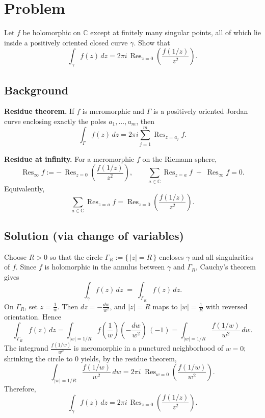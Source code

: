 \documentclass[12pt,a4paper]{article}
\begin{document}
	\section*{Problem}
	Let \(f\) be holomorphic on \(\mathbb C\) except at finitely many singular points, all of which lie inside a positively oriented closed curve \(\gamma\).
	Show that
	\[
	\int_{\gamma} f(z)\,dz
	=2\pi i \,\operatorname{Res}_{z=0}\!\left(\frac{f(1/z)}{z^{2}}\right).
	\]
	
	\subsection*{Background}
	\textbf{Residue theorem.}
	If \(f\) is meromorphic and \(\Gamma\) is a positively oriented Jordan curve enclosing exactly the poles \(a_1,\dots,a_m\),
	then
	\[
	\int_{\Gamma} f(z)\,dz = 2\pi i \sum_{j=1}^{m} \operatorname{Res}_{z=a_j} f.
	\]
	
	\textbf{Residue at infinity.}
	For a meromorphic \(f\) on the Riemann sphere,
	\[
	\operatorname{Res}_{\infty} f := -\,\operatorname{Res}_{z=0}\!\left(\frac{f(1/z)}{z^{2}}\right),\qquad
	\sum_{a\in\mathbb C}\operatorname{Res}_{z=a} f \;+\; \operatorname{Res}_{\infty} f = 0.
	\]
	Equivalently,
	\[
	\sum_{a\in\mathbb C}\operatorname{Res}_{z=a} f
	= \operatorname{Res}_{z=0}\!\left(\frac{f(1/z)}{z^{2}}\right).
	\]
	
	\subsection*{Solution (via change of variables)}
	Choose \(R>0\) so that the circle \(\Gamma_R:=\{\,|z|=R\,\}\) encloses \(\gamma\) and all singularities of \(f\).
	Since \(f\) is holomorphic in the annulus between \(\gamma\) and \(\Gamma_R\), Cauchy’s theorem gives
	\[
	\int_{\gamma} f(z)\,dz \;=\; \int_{\Gamma_R} f(z)\,dz.
	\]
	On \(\Gamma_R\), set \(z=\frac{1}{w}\). Then \(dz=-\frac{dw}{w^{2}}\), and \(|z|=R\) maps to \(|w|=\frac{1}{R}\) with reversed orientation.
	Hence
	\[
	\int_{\Gamma_R} f(z)\,dz
	= \int_{|w|=1/R} f\!\left(\frac{1}{w}\right)\!\left(-\frac{dw}{w^{2}}\right)\,(-1)
	= \int_{|w|=1/R} \frac{f(1/w)}{w^{2}}\,dw.
	\]
	The integrand \(\frac{f(1/w)}{w^{2}}\) is meromorphic in a punctured neighborhood of \(w=0\); shrinking the circle to \(0\) yields, by the residue theorem,
	\[
	\int_{|w|=1/R} \frac{f(1/w)}{w^{2}}\,dw
	= 2\pi i\;\operatorname{Res}_{w=0}\!\left(\frac{f(1/w)}{w^{2}}\right).
	\]
	Therefore,
	\[
	\boxed{\ \displaystyle
		\int_{\gamma} f(z)\,dz
		=2\pi i \,\operatorname{Res}_{z=0}\!\left(\frac{f(1/z)}{z^{2}}\right).\
	}
	\]
	
\end{document}
